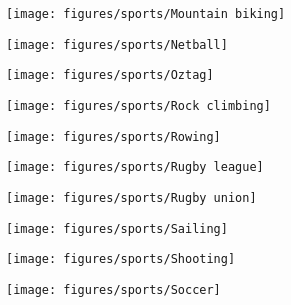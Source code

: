 \documentclass[11pt]{article}
\begin{document}
    \clearpage

    \begin{figure}[htb!]
        \centering

        \begin{subfigure}{.5\textwidth}
            \centering
            \texttt{[image: figures/sports/Mountain biking]}
        \end{subfigure}%
        \hfill
        \begin{subfigure}{.5\textwidth}
            \centering
            \texttt{[image: figures/sports/Netball]}
        \end{subfigure}%
        \hfill
        \begin{subfigure}{.5\textwidth}
            \centering
            \texttt{[image: figures/sports/Oztag]}
        \end{subfigure}%
        \hfill
        \begin{subfigure}{.5\textwidth}
            \centering
            \texttt{[image: figures/sports/Rock climbing]}
        \end{subfigure}%
        \hfill
        \begin{subfigure}{.5\textwidth}
            \centering
            \texttt{[image: figures/sports/Rowing]}
        \end{subfigure}%
        \hfill
        \begin{subfigure}{.5\textwidth}
            \centering
            \texttt{[image: figures/sports/Rugby league]}
        \end{subfigure}%
        \hfill
        \begin{subfigure}{.5\textwidth}
            \centering
            \texttt{[image: figures/sports/Rugby union]}
        \end{subfigure}%
        \hfill
        \begin{subfigure}{.5\textwidth}
            \centering
            \texttt{[image: figures/sports/Sailing]}
        \end{subfigure}%
        \hfill
        \begin{subfigure}{.5\textwidth}
            \centering
            \texttt{[image: figures/sports/Shooting]}
        \end{subfigure}%
        \hfill
        \begin{subfigure}{.5\textwidth}
            \centering
            \texttt{[image: figures/sports/Soccer]}
        \end{subfigure}%
    \end{figure}
\end{document}
